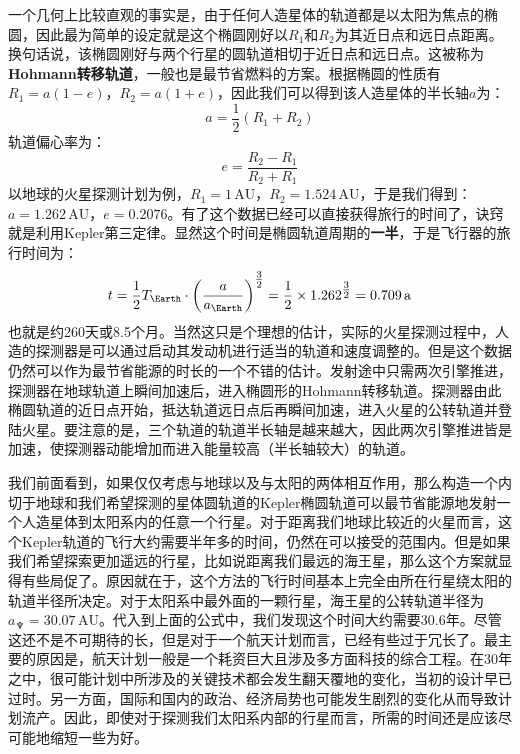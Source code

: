 \documentclass[a4paper,openany]{book}
\begin{document}
一个几何上比较直观的事实是，由于任何人造星体的轨道都是以太阳为焦点的椭圆，因此最为简单的设定就是这个椭圆刚好以$R_1$和$R_2$为其近日点和远日点距离。换句话说，该椭圆刚好与两个行星的圆轨道相切于近日点和远日点。这被称为\textbf{Hohmann转移轨道}，一般也是最节省燃料的方案。根据椭圆的性质有$R_1 = a(1 - e)$，$R_2 = a(1 + e)$，因此我们可以得到该人造星体的半长轴$a$为：
\[
    a = \frac{1}{2}(R_1 + R_2)
\]
轨道偏心率为：
\[
    e = \frac{R_2 - R_1}{R_2 + R_1}
\]
以地球的火星探测计划为例，$R_1 = 1\,\mathrm{AU}$，$R_2 = 1.524\,\mathrm{AU}$，于是我们得到：$a = 1.262\,\mathrm{AU}$，$e = 0.2076$。有了这个数据已经可以直接获得旅行的时间了，诀窍就是利用Kepler第三定律。显然这个时间是椭圆轨道周期的\textbf{一半}，于是飞行器的旅行时间为：
\[
    t = \frac{1}{2}T_{\Earth}\cdot\left(\frac{a}{a_{\Earth}}\right)^{\tfrac{3}{2}} = \frac{1}{2} \times 1.262^{\tfrac{3}{2}} = 0.709\,\mathrm{a}
\]
也就是约260天或8.5个月。当然这只是个理想的估计，实际的火星探测过程中，人造的探测器是可以通过启动其发动机进行适当的轨道和速度调整的。但是这个数据仍然可以作为最节省能源的时长的一个不错的估计。发射途中只需两次引擎推进，探测器在地球轨道上瞬间加速后，进入椭圆形的Hohmann转移轨道。探测器由此椭圆轨道的近日点开始，抵达轨道远日点后再瞬间加速，进入火星的公转轨道并登陆火星。要注意的是，三个轨道的轨道半长轴是越来越大，因此两次引擎推进皆是加速，使探测器动能增加而进入能量较高（半长轴较大）的轨道。

我们前面看到，如果仅仅考虑与地球以及与太阳的两体相互作用，那么构造一个内切于地球和我们希望探测的星体圆轨道的Kepler椭圆轨道可以最节省能源地发射一个人造星体到太阳系内的任意一个行星。对于距离我们地球比较近的火星而言，这个Kepler轨道的飞行大约需要半年多的时间，仍然在可以接受的范围内。但是如果我们希望探索更加遥远的行星，比如说距离我们最远的海王星，那么这个方案就显得有些局促了。原因就在于，这个方法的飞行时间基本上完全由所在行星绕太阳的轨道半径所决定。对于太阳系中最外面的一颗行星，海王星的公转轨道半径为$a_{\Neptune} = 30.07\,\mathrm{AU}$。代入到上面的公式中，我们发现这个时间大约需要30.6年。尽管这还不是不可期待的长，但是对于一个航天计划而言，已经有些过于冗长了。最主要的原因是，航天计划一般是一个耗资巨大且涉及多方面科技的综合工程。在30年之中，很可能计划中所涉及的关键技术都会发生翻天覆地的变化，当初的设计早已过时。另一方面，国际和国内的政治、经济局势也可能发生剧烈的变化从而导致计划流产。因此，即使对于探测我们太阳系内部的行星而言，所需的时间还是应该尽可能地缩短一些为好。
\end{document}
